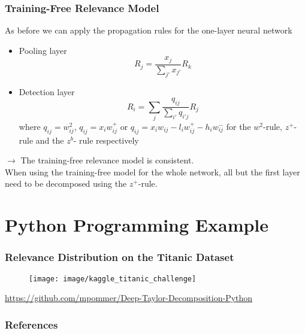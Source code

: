 \documentclass{beamer}
\begin{document}
\begin{frame}
\frametitle{Training-Free Relevance Model}
\vspace{0.25cm}
As before we can apply the propagation rules for the one-layer neural network
\begin{itemize}
\item Pooling layer
\begin{equation*}
R_j = \frac{x_j}{\sum_{j'} x_{j'}}R_k
\end{equation*}

\item Detection layer
\begin{equation*}
R_i = \sum_j \frac{q_{ij}}{\sum_{i'} q_{i'j}} R_j
\end{equation*}
where $q_{ij}= w_{ij}^2$, $q_{ij}= x_i w_{ij}^+$ or $q_{ij}= x_i w_{ij} - l_i w_{ij}^+ - h_i w_{ij}^-$ for the $w^2$-rule, $z^+$-rule and the $z^b$- rule respectively
\end{itemize}
\vspace{0.1cm}
$\rightarrow$ The training-free relevance model is consistent.\\

\vspace{0.5cm}
When using the training-free model for the whole network, all but the first layer need to be decomposed using the $z^+$-rule.
\end{frame}


\section{Python Programming Example}

\begin{frame}
\frametitle{Relevance Distribution on the Titanic Dataset}
\vspace{0.5cm}
\begin{figure}
\texttt{[image: image/kaggle\_titanic\_challenge]}
\end{figure}
\vspace{0.25cm}
\url{https://github.com/mpommer/Deep-Taylor-Decomposition-Python}
\end{frame}


\begin{frame}[allowframebreaks]
\frametitle{References}
\printbibliography
\end{frame}
\end{document}
